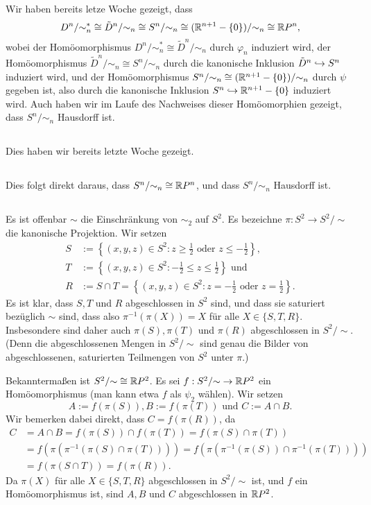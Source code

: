 \documentclass[a4paper,10pt]{article}
\begin{document}
Wir haben bereits letze Woche gezeigt, dass
\[
 D^n/{\sim^*_n}
 \cong \tilde{D}^n/{\sim_n}
 \cong S^n/{\sim_n}
 \cong (\mathbb{R}^{n+1}-\{0\})/{\sim_n}
 \cong \mathbb{R} P^n,
\]
wobei der Homöomorphismus $D^n/{\sim^*_n} \cong \tilde{D}^n/{\sim_n}$ durch $\varphi_n$ induziert wird, der Homöomorphismus $\tilde{D}^n/{\sim_n} \cong S^n/{\sim_n}$ durch die kanonische Inklusion $\tilde{D}^n \hookrightarrow S^n$ induziert wird, und der Homöomorphismus $S^n/{\sim_n} \cong (\mathbb{R}^{n+1}-\{0\})/{\sim_n}$ durch $\psi$ gegeben ist, also durch die kanonische Inklusion $S^n \hookrightarrow \mathbb{R}^{n+1} - \{0\}$ induziert wird. Auch haben wir im Laufe des Nachweises dieser Homöomorphien gezeigt, dass $S^n/{\sim_n}$ Hausdorff ist.


\subsection{}
Dies haben wir bereits letzte Woche gezeigt.


\subsection{}
Dies folgt direkt daraus, dass $S^n /{\sim_n} \cong \mathbb{R} P^n$, und dass $S^n/{\sim_n}$ Hausdorff ist.


\subsection{}
Es ist offenbar $\sim$ die Einschränkung von $\sim_2$ auf $S^2$. Es bezeichne $\pi : S^2 \to S^2/{\sim}$ die kanonische Projektion.
Wir setzen
\begin{align*}
 S &:= \left\{(x,y,z) \in S^2 : z \geq \frac{1}{2} \text{ oder } z \leq -\frac{1}{2} \right\}, \\
 T &:= \left\{(x,y,z) \in S^2 : -\frac{1}{2} \leq z \leq \frac{1}{2}\right\} \text{ und} \\
 R &:= S \cap T = \left\{(x,y,z) \in S^2 : z = -\frac{1}{2} \text{ oder } z = \frac{1}{2} \right\}.
\end{align*}
Es ist klar, dass $S,T$ und $R$ abgeschlossen in $S^2$ sind, und dass sie saturiert bezüglich $\sim$ sind, dass also $\pi^{-1}(\pi(X)) = X$ für alle $X \in \{S,T,R\}$. Insbesondere sind daher auch $\pi(S), \pi(T)$ und $\pi(R)$ abgeschlossen in $S^2/{\sim}$. (Denn die abgeschlossenen Mengen in $S^2/{\sim}$ sind genau die Bilder von abgeschlossenen, saturierten Teilmengen von $S^2$ unter $\pi$.)

Bekanntermaßen ist $S^2 /{\sim} \cong \mathbb{R} P^2$. Es sei $f : S^2 /{\sim} \to \mathbb{R} P^2$ ein Homöomorphismus (man kann etwa $f$ als $\psi_2$ wählen). Wir setzen
\[
 A := f(\pi(S)), B := f(\pi(T)) \text{ und } C := A \cap B.
\]
Wir bemerken dabei direkt, dass $C =  f(\pi(R))$, da
\begin{align*}
 C
 &= A \cap B
 = f(\pi(S)) \cap f(\pi(T))
 = f(\pi(S) \cap \pi(T)) \\
 &= f(\pi(\pi^{-1}(\pi(S) \cap \pi(T))))
 = f(\pi(\pi^{-1}(\pi(S)) \cap \pi^{-1}(\pi(T)))) \\
 &= f(\pi(S \cap T))
 = f(\pi(R)).
\end{align*}
Da $\pi(X)$ für alle $X \in \{S,T,R\}$ abgeschlossen in $S^2/{\sim}$ ist, und $f$ ein Homöomorphismus ist, sind $A, B$ und $C$ abgeschlossen in $\mathbb{R} P^2$.
\end{document}
